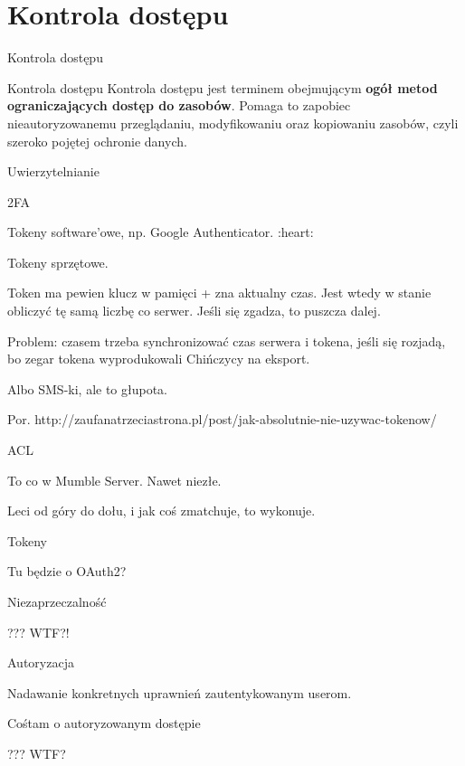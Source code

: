 \section{Kontrola dostępu}

\begin{frame}{Kontrola dostępu}
		\begin{alertblock}{Kontrola dostępu}
			Kontrola dostępu jest terminem obejmującym \textbf{ogół metod ograniczających dostęp do zasobów}.
			Pomaga to zapobiec nieautoryzowanemu przeglądaniu, modyfikowaniu oraz kopiowaniu zasobów, czyli szeroko pojętej ochronie danych. 
		\end{alertblock}		
\end{frame}


\begin{frame}{Uwierzytelnianie}

\end{frame}

\begin{frame}{2FA}
	
	Tokeny software'owe, np. Google Authenticator. :heart: %
	
	Tokeny sprzętowe.
	
	Token ma pewien klucz w pamięci + zna aktualny czas. Jest wtedy w stanie obliczyć tę samą liczbę co serwer. Jeśli się zgadza, to puszcza dalej.
	
	Problem: czasem trzeba synchronizować czas serwera i tokena, jeśli się rozjadą, bo zegar tokena wyprodukowali Chińczycy na eksport.
	
	Albo SMS-ki, ale to głupota.
	
	Por. http://zaufanatrzeciastrona.pl/post/jak-absolutnie-nie-uzywac-tokenow/
	
\end{frame}

\begin{frame}{ACL}
	
	To co w Mumble Server. Nawet niezłe.
	
	Leci od góry do dołu, i jak coś zmatchuje, to wykonuje.
	
\end{frame}

\begin{frame}{Tokeny}
	
	Tu będzie o OAuth2?
	
\end{frame}

\begin{frame}{Niezaprzeczalność}
	
	??? WTF?!
	
\end{frame}

\begin{frame}{Autoryzacja}
	
	Nadawanie konkretnych uprawnień zautentykowanym userom.
	
\end{frame}

\begin{frame}{Cośtam o autoryzowanym dostępie}
	
	??? WTF?
	
\end{frame}


